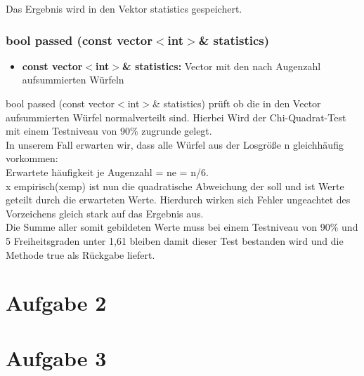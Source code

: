 \documentclass{../Vorlage/sebDenCls}
\begin{document}
Das Ergebnis wird in den Vektor statistics gespeichert.

\subsubsection{bool passed (const vector$<$int$>$\& statistics)}
\begin{itemize}
	\item \textbf{const vector$<$int$>$\& statistics:} Vector mit den nach Augenzahl aufsummierten Würfeln
\end{itemize}
bool passed (const vector$<$int$>$\& statistics) prüft ob die in den Vector aufsummierten Würfel normalverteilt sind. Hierbei Wird der Chi-Quadrat-Test mit einem Testniveau von 90\% zugrunde gelegt. \\

In unserem Fall erwarten wir, dass alle Würfel aus der Losgröße n gleichhäufig vorkommen:\\ 
Erwartete häufigkeit je Augenzahl = ne = n/6.\\

x empirisch(xemp) ist nun die quadratische Abweichung der soll und ist Werte geteilt durch die erwarteten Werte. Hierdurch wirken sich Fehler ungeachtet des Vorzeichens gleich stark auf das Ergebnis aus. \\

Die Summe aller somit gebildeten Werte muss bei einem Testniveau von 90\% und 5 Freiheitsgraden unter 1,61 bleiben damit dieser Test bestanden wird und die Methode true als Rückgabe liefert.

\section*{Aufgabe 2}



\section*{Aufgabe 3}
\end{document}
